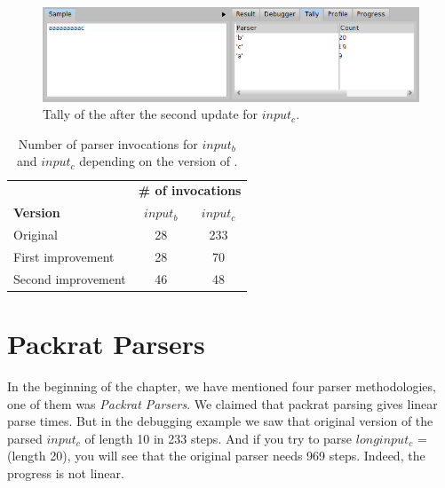 \documentclass[a4paper,10pt,twoside]{book}
\begin{document}
\begin{figure}
  \begin{center}
    \includegraphics[width=\linewidth]{example-tallyAaac-update-2}
    \caption{Tally of the  after the second update for $input_c$. \label{fig:pp/example-tallyAaac-update-2}}
  \end{center}
\end{figure}

\begin{table}
  \centering
  \begin{tabular}{lcc}
    \toprule
                       & \multicolumn{2}{c}{\textbf{\# of invocations}} \\
    \textbf{Version}   & ${input_b}$                                    & ${input_c}$ \\
    \midrule
    Original           & 28                                             & 233         \\
    First improvement  & 28                                             & 70          \\
    Second improvement & 46                                             & 48          \\
    \bottomrule
  \end{tabular}
  \caption{Number of parser invocations for $input_b$ and $input_c$ depending on the version of .}
  \label{tab:example-tally}
\end{table}


\section{Packrat Parsers}

In the beginning of the chapter, we have mentioned four parser methodologies, one of them was \emph{Packrat Parsers}.
We claimed that packrat parsing gives linear parse times.
But in the debugging example we saw that original version of the  parsed $input_c$ of length 10 in 233 steps.
And if you try to parse $longinput_c$ =  (length 20), you will see that the original parser needs 969 steps.
Indeed, the progress is not linear.
\end{document}
